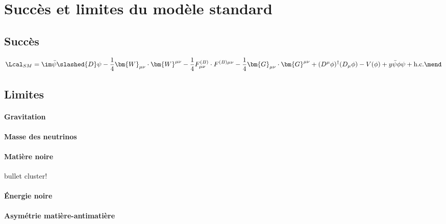 \section{Succès et limites du modèle standard}\label{chapter-MS-MSSM-section-succes_limites}
\subsection{Succès}\label{chapter-MS-MSSM-section-succes_limites-subsec-succes}

\begin{equation}
\Lcal_{SM} = 
\im \bar{\psi} \slashed{D} \psi
- \frac{1}{4} \bm{W}_{\mu\nu} \cdot \bm{W}^{\mu\nu} - \frac{1}{4} F^{(B)}_{\mu\nu} \cdot F^{(B)\mu\nu}
- \frac{1}{4} \bm{G}_{\mu\nu} \cdot \bm{G}^{\mu\nu}
+ (D^\mu\phi)^\dagger(D_\mu\phi) - V(\phi)
+ y \bar{\psi}\phi\psi + \text{h.c.}
\mend
\end{equation}

\subsection{Limites}\label{chapter-MS-MSSM-section-succes_limites-subsec-limites}
\paragraph{Gravitation}
\paragraph{Masse des neutrinos}
\paragraph{Matière noire}
bullet cluster!\cite{Clowe_2006}
\paragraph{Énergie noire}
\paragraph{Asymétrie matière-antimatière}
